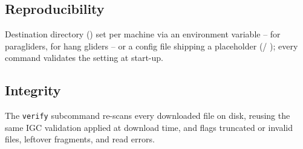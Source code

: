 \subsection{Reproducibility}
\label{impl:acqrepro}
Destination directory () set per machine via an environment
variable --  for paragliders,
 for hang gliders -- or a config file
shipping a placeholder (/
); every command validates the setting at start-up.

\subsection{Integrity}
\label{impl:acqintegrity}
The \texttt{verify} subcommand re-scans every downloaded file on disk, reusing the same
IGC validation applied at download time, and flags truncated or invalid files, leftover
 fragments, and read errors.
